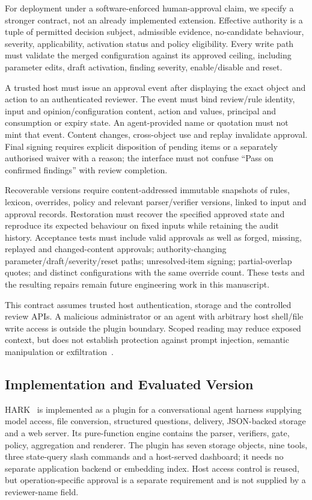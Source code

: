 For deployment under a software-enforced human-approval claim, we specify a stronger contract, not an already implemented extension. Effective authority is a tuple of permitted decision subject, admissible evidence, no-candidate behaviour, severity, applicability, activation status and policy eligibility. Every write path must validate the merged configuration against its approved ceiling, including parameter edits, draft activation, finding severity, enable/disable and reset.

A trusted host must issue an approval event after displaying the exact object and action to an authenticated reviewer. The event must bind review/rule identity, input and opinion/configuration content, action and values, principal and consumption or expiry state. An agent-provided name or quotation must not mint that event. Content changes, cross-object use and replay invalidate approval. Final signing requires explicit disposition of pending items or a separately authorised waiver with a reason; the interface must not confuse ``Pass on confirmed findings'' with review completion.

Recoverable versions require content-addressed immutable snapshots of rules, lexicon, overrides, policy and relevant parser/verifier versions, linked to input and approval records. Restoration must recover the specified approved state and reproduce its expected behaviour on fixed inputs while retaining the audit history. Acceptance tests must include valid approvals as well as forged, missing, replayed and changed-content approvals; authority-changing parameter/draft/severity/reset paths; unresolved-item signing; partial-overlap quotes; and distinct configurations with the same override count. These tests and the resulting repairs remain future engineering work in this manuscript.

This contract assumes trusted host authentication, storage and the controlled review APIs. A malicious administrator or an agent with arbitrary host shell/file write access is outside the plugin boundary. Scoped reading may reduce exposed context, but does not establish protection against prompt injection, semantic manipulation or exfiltration~\cite{shi2024inject,mempriv2025}.

\subsection{Implementation and Evaluated Version}\label{sec:impl}

HARK~\cite{artifact} is implemented as a plugin for a conversational agent harness supplying model access, file conversion, structured questions, delivery, JSON-backed storage and a web server. Its pure-function engine contains the parser, verifiers, gate, policy, aggregation and renderer. The plugin has seven storage objects, nine tools, three state-query slash commands and a host-served dashboard; it needs no separate application backend or embedding index. Host access control is reused, but operation-specific approval is a separate requirement and is not supplied by a reviewer-name field.

